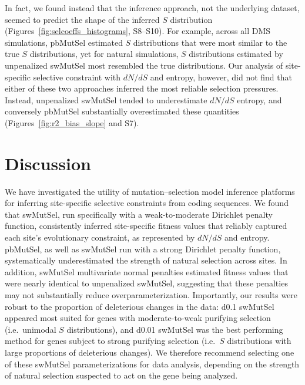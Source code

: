 \documentclass[11pt]{article}
\begin{document}
In fact, we found instead that the inference approach, not the underlying dataset, seemed to predict the shape of the inferred $S$ distribution (Figures~\ref{fig:selcoeffs_histograms}, S8--S10). For example, across all DMS simulations, pbMutSel estimated $S$ distributions that were most similar to the true $S$ distributions, yet for natural simulations, $S$ distributions estimated by unpenalized swMutSel most resembled the true distributions. Our analysis of site-specific selective constraint with $dN/dS$ and entropy, however, did not find that either of these two approaches inferred the most reliable selection pressures. Instead, unpenalized swMutSel tended to underestimate $dN/dS$ entropy, and conversely pbMutSel substantially overestimated these quantities (Figures~\ref{fig:r2_bias_slope} and S7).


\section*{Discussion}

We have investigated the utility of mutation--selection model inference platforms for inferring site-specific selective constraints from coding sequences. We found that swMutSel, run specifically with a weak-to-moderate Dirichlet penalty function, consistently inferred site-specific fitness values that reliably captured each site's evolutionary constraint, as represented by $dN/dS$ and entropy. pbMutSel, as well as swMutSel run with a strong Dirichlet penalty function, systematically underestimated the strength of natural selection across sites. In addition, swMutSel multivariate normal penalties estimated fitness values that were nearly identical to unpenalized swMutSel, suggesting that these penalties may not substantially reduce overparameterization. Importantly, our results were robust to the proportion of deleterious changes in the data: d0.1 swMutSel appeared most suited for genes with moderate-to-weak purifying selection (i.e.\ unimodal $S$ distributions), and d0.01 swMutSel was the best performing method for genes subject to strong purifying selection (i.e.\ $S$ distributions with large proportions of deleterious changes). We therefore recommend selecting one of these swMutSel parameterizations for data analysis, depending on the strength of natural selection suspected to act on the gene being analyzed.
\end{document}

